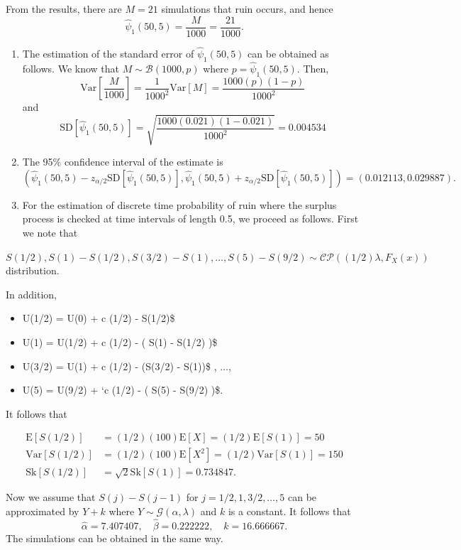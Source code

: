\documentclass[landscape, 20pt]{extreport}
\theoremstyle{definition}
\theoremstyle{definition}
\theoremstyle{definition}
\theoremstyle{definition}
\theoremstyle{remark}
\begin{document}
From the results, there are \(M = 21\) simulations that ruin occurs, and hence
\[\hat{\psi}_1(50, 5) = \frac{M}{1000} = \frac{21}{1000}.\]

\begin{enumerate}
\def\labelenumi{\arabic{enumi}.}
\setcounter{enumi}{1}
\item
  The estimation of the standard error of \(\hat{\psi}_1(50, 5)\) can be obtained as follows. We know that \(M \sim \mathcal{B}(1000,p)\) where \(p = \hat{\psi}_1(50, 5)\). Then,
  \[\textrm{Var}\left[\frac{M}{1000}\right] = \frac{1}{1000^2}\textrm{Var}[M] = \frac{1000 (p) (1-p)}{1000^2}\] and
  \[ \textrm{SD}[\hat{\psi}_1(50, 5)] = \sqrt{\frac{1000 (0.021) (1-0.021)}{1000^2}} = 0.004534 \]
\item
  The 95\% confidence interval of the estimate is
  \[ (\hat{\psi}_1(50, 5) - z_{\alpha/2}\textrm{SD}[\hat{\psi}_1(50, 5)], \hat{\psi}_1(50, 5) + z_{\alpha/2} \textrm{SD}[\hat{\psi}_1(50, 5)]) = (0.012113,0.029887).\]
\item
  For the estimation of discrete time probability of ruin where the surplus process is checked at time intervals of length 0.5, we proceed as follows. First we note that
\end{enumerate}

\(S(1/2), S(1) - S(1/2), S(3/2) - S(1), \ldots, S(5) - S(9/2) \sim \mathcal{CP}((1/2)\lambda, F_X(x))\) distribution.

In addition,

\begin{itemize}
\item
  U(1/2) = U(0) + c (1/2) - S(1/2)\$
\item
  U(1) = U(1/2) + c (1/2) - ( S(1) - S(1/2) )\$
\item
  U(3/2) = U(1) + c (1/2) - (S(3/2) - S(1))\$ , \(\ldots\),
\item
  U(5) = U(9/2) + `c (1/2) - ( S(5) - S(9/2) )\$.
\end{itemize}

It follows that

\begin{align}
\mathrm{E}[S(1/2)] &= (1/2)(100)\mathrm{E}[X] = (1/2)\mathrm{E}[S(1)] = 50 \\
\mathrm{Var}[S(1/2)] &= (1/2)(100)\mathrm{E}[X^2] =  (1/2)\mathrm{Var}[S(1)]  = 150 \\
\mathrm{Sk}[S(1/2)] &= \sqrt{2} \mathrm{Sk}[S(1)] = 0.734847 .
\end{align}

Now we assume that \(S(j) - S(j-1)\) for \(j = 1/2, 1, 3/2, \ldots, 5\) can be approximated by \(Y + k\) where
\(Y \sim \mathcal{G}(\alpha, \lambda)\) and \(k\) is a constant. It follows that
\[ \hat{\alpha} = 7.407407, \quad \hat{\beta} = 0.222222, \quad \hat{k} = 16.666667.  \]
The simulations can be obtained in the same way.
\end{document}
